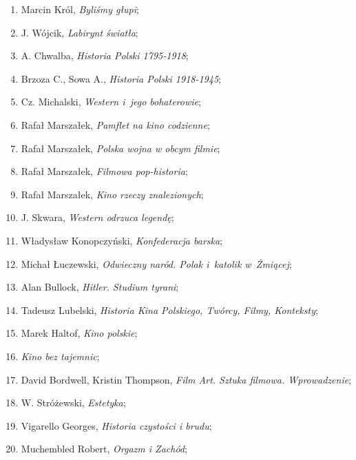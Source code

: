 \documentclass[a4paper,11pt]{article}
\begin{document}
\begin{enumerate}
\item Marcin Król, \emph{Byliśmy głupi};

\item J. Wójcik, \emph{Labirynt światła};

\item A. Chwalba, \emph{Historia Polski 1795-1918};

\item Brzoza C., Sowa A., \emph{Historia Polski 1918-1945};

\item Cz. Michalski, \emph{Western i~jego bohaterowie};

\item Rafał Marszałek, \emph{Pamflet na kino codzienne};

\item Rafał Marszałek, \emph{Polska wojna w obcym filmie};

\item Rafał Marszałek, \emph{Filmowa pop-historia};

\item Rafał Marszałek, \emph{Kino rzeczy znalezionych};

\item J. Skwara, \emph{Western odrzuca legendę};

\item Władysław Konopczyński, \emph{Konfederacja barska};

\item Michał Łuczewski, \emph{Odwieczny naród. Polak i~katolik
    w~Żmiącej};

\item Alan Bullock, \emph{Hitler. Studium tyrani};

\item Tadeusz Lubelski, \emph{Historia Kina Polskiego, Twórcy, Filmy,
    Konteksty};

\item Marek Haltof, \emph{Kino polskie};

\item \emph{Kino bez tajemnic};

\item David Bordwell, Kristin Thompson, \emph{Film Art. Sztuka
    filmowa. Wprowadzenie};

\item W. Stróżewski, \emph{Estetyka};

\item Vigarello Georges, \emph{Historia czystości i brudu};

\item Muchembled Robert, \emph{Orgazm i Zachód};


\end{enumerate}
\end{document}
